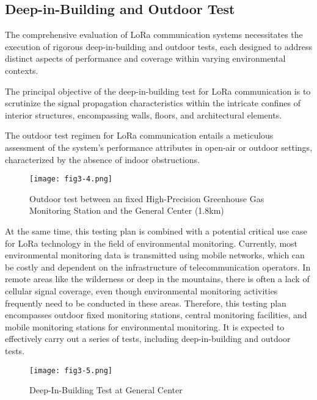 \subsection{Deep-in-Building and Outdoor Test}
The comprehensive evaluation of LoRa communication systems necessitates the execution of rigorous deep-in-building and outdoor tests, each designed to address distinct aspects of performance and coverage within varying environmental contexts.

The principal objective of the deep-in-building test for LoRa communication is to scrutinize the signal propagation characteristics within the intricate confines of interior structures, encompassing walls, floors, and architectural elements.

The outdoor test regimen for LoRa communication entails a meticulous assessment of the system's performance attributes in open-air or outdoor settings, characterized by the absence of indoor obstructions.
\begin{figure}
  \centering
  \texttt{[image: fig3-4.png]}
  \caption{Outdoor test between an fixed High-Precision Greenhouse Gas Monitoring Station and the General Center (1.8km)}
  \label{fig:3-4}
\end{figure}
At the same time, this testing plan is combined with a potential critical use case for LoRa technology in the field of environmental monitoring\cite{8515030}. Currently, most environmental monitoring data is transmitted using mobile networks, which can be costly and dependent on the infrastructure of telecommunication operators. In remote areas like the wilderness or deep in the mountains, there is often a lack of cellular signal coverage, even though environmental monitoring activities frequently need to be conducted in these areas. Therefore, this testing plan encompasses outdoor fixed monitoring stations, central monitoring facilities, and mobile monitoring stations for environmental monitoring. It is expected to effectively carry out a series of tests, including deep-in-building and outdoor tests.
\begin{figure}
  \centering
  \texttt{[image: fig3-5.png]}
  \caption{Deep-In-Building Test at General Center}
  \label{fig:3-5}
\end{figure}

